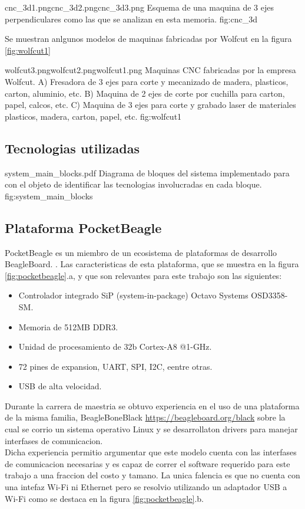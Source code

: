            {cnc_3d1.png}{cnc_3d2.png}{cnc_3d3.png}
            {Esquema de una maquina de 3 ejes perpendiculares como las que se analizan en esta memoria.}
            {fig:cnc_3d}

Se muestran anlgunos modelos de maquinas fabricadas por Wolfcut en la figura \ref{fig:wolfcut1}

            {wolfcut3.png}{wolfcut2.png}{wolfcut1.png}
            {Maquinas CNC fabricadas por la empresa Wolfcut. A) Fresadora de 3 ejes para corte y mecanizado de madera, plasticos, carton, aluminio, etc. B) Maquina de 2 ejes de corte por cuchilla para carton, papel, calcos, etc. C) Maquina de 3 ejes para corte y grabado laser de materiales plasticos, madera, carton, papel, etc.}
            {fig:wolfcut1}


\subsection{Tecnologias utilizadas}

         {system_main_blocks.pdf}
         {Diagrama de bloques del sistema implementado para con el objeto de identificar las tecnologias involucradas en cada bloque.}
         {fig:system_main_blocks}

\subsection{Plataforma PocketBeagle}
   PocketBeagle es un miembro de un ecosistema de plataformas de desarrollo BeagleBoard. \citep{WEBSITE:beagleboard}.
   Las caracteristicas de esta plataforma, que se muestra en la figura \ref{fig:pocketbeagle}.a, y que son relevantes para este trabajo son las siguientes:
   \begin{itemize}
      \item{Controlador integrado SiP (system-in-package) Octavo Systems OSD3358-SM.}
      \item{Memoria de 512MB DDR3.}
      \item{Unidad de procesamiento de 32b Cortex-A8 @1-GHz.}
      \item{72 pines de expansion, UART, SPI, I2C, eentre otras.}
      \item{USB de alta velocidad.}
   \end{itemize}
   Durante la carrera de maestria se obtuvo experiencia en el uso de una plataforma de la misma familia, BeagleBoneBlack \url{https://beagleboard.org/black} sobre la cual se corrio un sistema operativo Linux y se desarrollaton drivers para manejar interfases de comunicacion. \\
   Dicha experiencia permitio argumentar que este modelo cuenta con las interfases de comunicacion necesarias y es capaz de correr el software requerido para este trabajo a una fraccion del costo y tamano.
   La unica falencia es que no cuenta con una intefaz Wi-Fi ni Ethernet pero se resolvio utilizando un adaptador USB a Wi-Fi como se destaca en la figura \ref{fig:pocketbeagle}.b.

